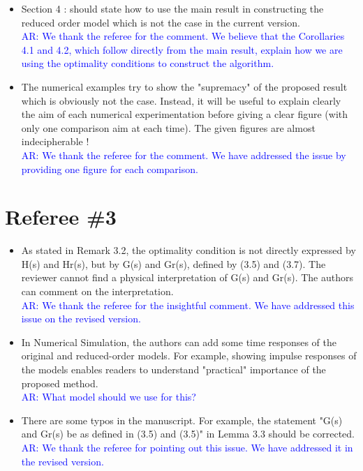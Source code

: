 \documentclass[11pt]{article}
\def\serkan#1{\textcolor{blue}{{#1}}}
\begin{document}
\begin{itemize}
\item Section 4 : should state how to use the main result in constructing
the reduced order model which is not the case in the current version.\\
\serkan{\textsf{AR}:  We thank the referee for the comment. We believe that the Corollaries 4.1 and 4.2, which follow directly from the main result, explain how we are using the optimality conditions to construct the algorithm.}

\item The numerical examples try to show the "supremacy" of the proposed
result which is obviously not the case. Instead, it will be useful to
explain clearly the aim of each numerical experimentation before giving
a clear figure (with only one comparison aim at each time). The given
figures are almost indecipherable !\\

\serkan{\textsf{AR}:  We thank the referee for the comment. We have addressed the issue by providing one figure for each comparison.}

\end{itemize}

\section*{Referee \#3}

\begin{itemize}
\item As stated in Remark 3.2, the optimality condition is not directly
expressed by H(s) and Hr(s), but by G(s) and Gr(s), defined by (3.5)
and (3.7).  The reviewer cannot find a physical interpretation of G(s)
and Gr(s).  The authors can comment on the interpretation.\\
\serkan{\textsf{AR}:  We thank the referee for the insightful comment. We have addressed this issue on the revised version.}

\item In Numerical Simulation, the authors can add some time responses of
the original and reduced-order models.	For example, showing impulse
responses of the models enables readers to understand "practical"
importance of the proposed method.\\
\serkan{\textsf{AR}:  What model should we use for this?}

\item  There are some typos in the manuscript.  For example, the statement
"G(s) and Gr(s) be as defined in (3.5) and (3.5)" in Lemma 3.3 should
be corrected. \\
\serkan{\textsf{AR}:  We thank the referee for pointing out this issue. We have addressed it in the revised version.}

\end{itemize}
\end{document}
